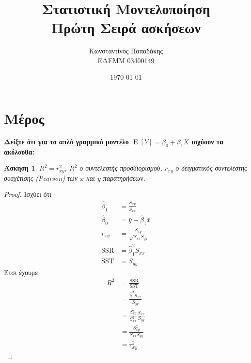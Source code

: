 \documentclass{article}
\title{\textbf{Στατιστική Μοντελοποίηση} \\ Πρώτη Σειρά ασκήσεων}
\author{Κωνσταντίνος Παπαδάκης\\\scriptsize{ΕΔΕΜΜ 03400149}}
\date{\today}
\DeclareMathOperator{\E}{\mathrm{E}}
\newcommand{\SSR}{\mathrm{SSR}}
\newcommand{\SST}{\mathrm{SST}}
\newcommand{\hb}{\hat{\beta}}
\newtheorem{exercise}{Άσκηση}[section]
\begin{document}
\begin{titlepage}
    \maketitle
\end{titlepage}

\section{Μέρος}

\textbf{Δείξτε ότι για το \underline{απλό γραμμικό μοντέλο} \(\E[Y] = β_0 + β_1 X\) ισχύουν τα ακόλουθα:}


\begin{exercise}
    \(R^2 = r_{xy}^2\), \(R^2\) ο συντελεστής προσδιορισμού, \(r_{xy}\) ο δειγματικός συντελεστής συσχέτισης (\textlatin{Pearson}) των \(x\) και \(y\) παρατηρήσεων.
\end{exercise}
\begin{proof}
    Ισχύει ότι
    \begin{align}
        \hb_1 &= \frac{S_{xy}}{S_{xx}}\\
        \hb_0 &= \bar{y} - \hb_1 \bar{x}\\
        r_{xy} &= \frac{S_{xy}}{\sqrt{S_{xx} S_{yy}}}\\
        \SSR &= \hb_1^2 S_{xx}\\
        \SST &= S_{yy}
    \end{align}
    Έτσι έχουμε
    \begin{equation*}
    \begin{split}
        R^2 &= \frac{\SSR}{\SST}\\
            &= \frac{\hb_1^2 S_{xx}}{S_{yy}}\\
            &= \frac{S_{xy}^2}{S_{xx}^2} \frac{S_{xx}}{S_{yy}}\\
            &= \frac{S_{xy}^2}{S_{xx} S_{yy}}\\
            &= r_{xy}^2
    \end{split}
    \end{equation*}
\end{proof}
\end{document}
